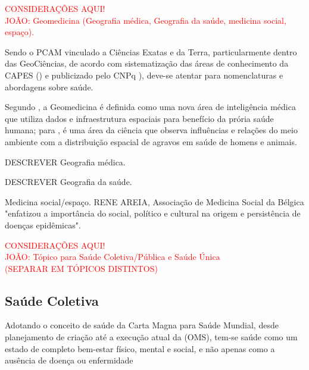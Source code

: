 \begin{center}
\textcolor{red}{CONSIDERAÇÕES AQUI!}\\
\textcolor{red}{JOÃO: Geomedicina (Geografia médica, Geografia da saúde, medicina social, espaço).}\\
\end{center}

\indent Sendo o \acrfull{PCAM} vinculado a Ciências Exatas e da Terra, particularmente dentro das GeoCiências, de acordo com sistematização das áreas de conhecimento da \acrfull{CAPES} (\citeyear{CAPES_Tabela_Conhecimento}) e publicizado pelo \acrfull{CNPq} \citeyear{CNPq_Tabela_Conhecimento}), deve-se atentar para nomenclaturas e abordagens sobre saúde.

\indent Segundo , a Geomedicina é definida como uma nova área de inteligência médica que utiliza dados e infraestrutura espaciais para benefício da prória saúde humana; para , é uma área da ciência que observa influências e relações do meio ambiente com a distribuição espacial de agravos em saúde de homens e animais.

\indent DESCREVER Geografia médica.

\indent DESCREVER Geografia da saúde.

\indent Medicina social/espaço. RENE AREIA, Associação de Medicina Social da Bélgica "enfatizou a importância do social, político e cultural na origem e persistência de doenças epidêmicas".

\begin{center}
\textcolor{red}{CONSIDERAÇÕES AQUI!}\\
\indent \textcolor{red}{JOÃO: Tópico para Saúde Coletiva/Pública e Saúde Única\\(SEPARAR EM TÓPICOS DISTINTOS)}\\
\end{center}


\subsection{Saúde Coletiva}

\indent Adotando o conceito de saúde da Carta Magna para Saúde Mundial, desde planejamento de criação até a execução atual da  (\acrshort{OMS}), tem-se saúde como um estado de completo bem-estar físico, mental e social, e não apenas como a ausência de doença ou enfermidade \cite{ParranHEALTH}

